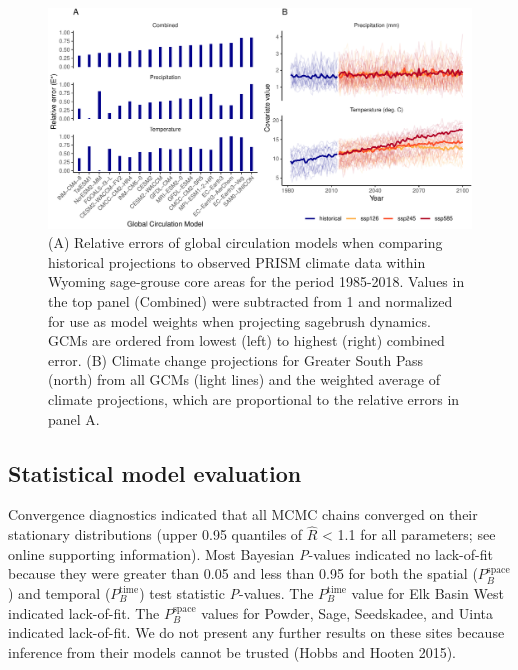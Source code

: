 \documentclass[
  12pt,
]{article}
\begin{document}
\begin{figure}
\centering
\includegraphics{sageCastManuscript_files/figure-latex/gcm-ranks-1.pdf}
\caption{\label{fig:gcm-ranks}(A) Relative errors of global circulation models when comparing historical projections to observed PRISM climate data within Wyoming sage-grouse core areas for the period 1985-2018. Values in the top panel (Combined) were subtracted from 1 and normalized for use as model weights when projecting sagebrush dynamics. GCMs are ordered from lowest (left) to highest (right) combined error. (B) Climate change projections for Greater South Pass (north) from all GCMs (light lines) and the weighted average of climate projections, which are proportional to the relative errors in panel A.}
\end{figure}

\hypertarget{statistical-model-evaluation}{%
\subsection{Statistical model evaluation}\label{statistical-model-evaluation}}

Convergence diagnostics indicated that all MCMC chains converged on their stationary distributions (upper 0.95 quantiles of \(\hat{R}\) \textless{} 1.1 for all parameters; see online supporting information).
Most Bayesian \emph{P}-values indicated no lack-of-fit because they were greater than 0.05 and less than 0.95 for both the spatial (\(P_B^{\text{space}}\)) and temporal (\(P_B^{\text{time}}\)) test statistic \emph{P}-values.
The \(P_B^{\text{time}}\) value for Elk Basin West indicated lack-of-fit.
The \(P_B^{\text{space}}\) values for Powder, Sage, Seedskadee, and Uinta indicated lack-of-fit.
We do not present any further results on these sites because inference from their models cannot be trusted (Hobbs and Hooten 2015).
\end{document}
